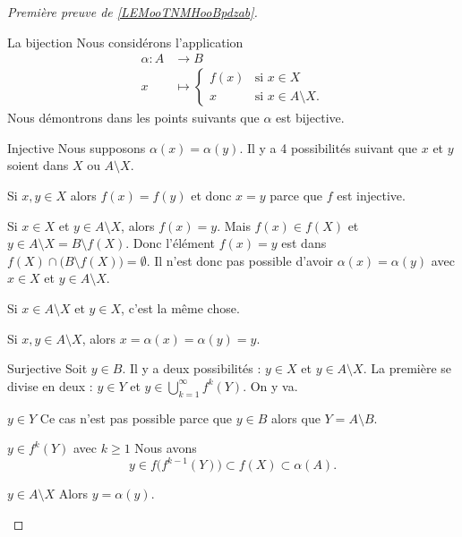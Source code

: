 \begin{proof}[Première preuve de \ref{LEMooTNMHooBpdzab}]
\begin{subproof}
        \item[La bijection]
            Nous considérons l'application
            \begin{equation}
                \begin{aligned}
                    \alpha\colon A&\to B \\
                    x&\mapsto \begin{cases}
                        f(x)    &   \text{si } x\in X\\
                        x    &    \text{si } x\in A\setminus X.
                    \end{cases}
                \end{aligned}
            \end{equation}
            Nous démontrons dans les points suivants que \( \alpha\) est bijective.
        \item[Injective]
            Nous supposons \( \alpha(x)=\alpha(y)\). Il y a 4 possibilités suivant que \( x\) et \( y\) soient dans \( X\) ou \( A\setminus X\).

            Si \( x,y\in X\) alors \( f(x)=f(y)\) et donc \( x=y\) parce que \( f\) est injective.

            Si \( x\in X\) et \( y\in A\setminus X\), alors \( f(x)=y\). Mais \( f(x)\in f(X)\) et \( y\in A\setminus X=B\setminus f(X)\). Donc l'élément \( f(x)=y\) est dans \( f(X)\cap \big( B\setminus f(X) \big)=\emptyset\). Il n'est donc pas possible d'avoir \( \alpha(x)=\alpha(y)\) avec \( x\in X\) et \( y\in A\setminus X\).

            Si \( x\in A\setminus X\) et \( y\in X\), c'est la même chose.

            Si \( x,y\in A\setminus X\), alors \( x=\alpha(x)=\alpha(y)=y\).

        \item[Surjective]
            Soit \( y\in B\). Il y a deux possibilités : \( y\in X\) et \( y\in A\setminus X\). La première se divise en deux : \( y\in Y\) et \( y\in \bigcup_{k=1}^{\infty}f^k(Y)\). On y va.

            \begin{subproof}
                \item[\( y\in Y\)]
                    Ce cas n'est pas possible parce que \( y\in B\) alors que \( Y=A\setminus B\).
                \item[\( y\in f^k(Y)\) avec \( k\geq 1\)]
                    Nous avons
                    \begin{equation}
                         y\in f\big( f^{k-1}(Y) \big)\subset f(X)\subset \alpha(A).
                    \end{equation}
                \item[\( y\in A\setminus X\)]
                    Alors \( y=\alpha(y)\).
            \end{subproof}
    \end{subproof}
\end{proof}


